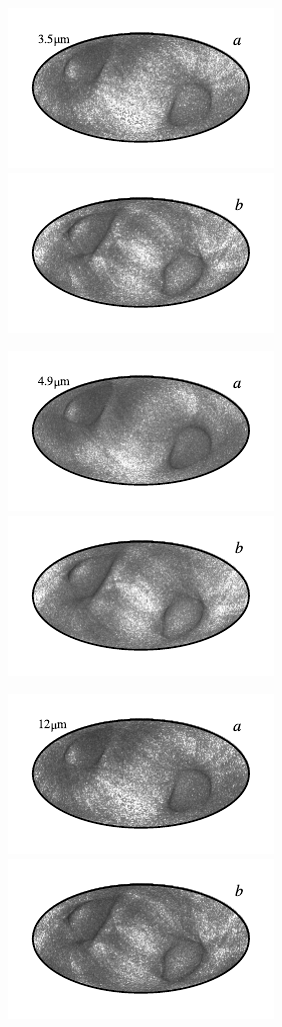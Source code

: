 \documentclass{aa}
\begin{document}
\begin{figure}
	\includegraphics{figs/rms_maps/rms_03a_c0001_000019.pdf}\includegraphics{figs/rms_maps/rms_03b_c0001_000019.pdf}
  \vspace*{-0.85cm}

	\includegraphics{figs/rms_maps/rms_04a_c0001_000019.pdf}\includegraphics{figs/rms_maps/rms_04b_c0001_000019.pdf}
  \vspace*{-0.85cm}

	\includegraphics{figs/rms_maps/rms_05a_c0001_000019.pdf}\includegraphics{figs/rms_maps/rms_05b_c0001_000019.pdf}
  \vspace*{-0.85cm}


\end{figure}
\end{document}
